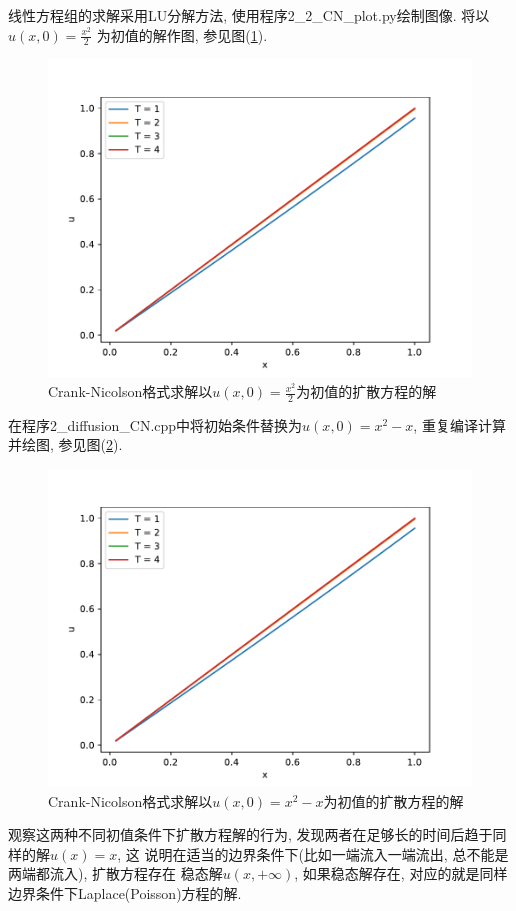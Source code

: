\documentclass[a4paper,zihao=5,UTF8]{ctexart}
\begin{document}
	线性方程组的求解采用LU分解方法, 使用程序2\_2\_CN\_plot.py绘制图像. 将以$u(x, 0) = \frac{x^2}{2}$
	为初值的解作图, 参见图(\ref{2-2-CN-1}). 
	\begin{figure}[htbp]
		\centering 
		\includegraphics[scale=0.7]{2_2_CN_1.pdf}
		\caption{Crank-Nicolson格式求解以$u(x, 0) = \frac{x^2}{2}$为初值的扩散方程的解}
		\label{2-2-CN-1}
	\end{figure} 
	在程序2\_diffusion\_CN.cpp中将初始条件替换为$u(x, 0) = x^2 - x$, 重复编译计算并绘图, 参见图(\ref{2-2-CN-2}). 
	\begin{figure}[htbp]
		\centering 
		\includegraphics[scale=0.7]{2_2_CN_1.pdf}
		\caption{Crank-Nicolson格式求解以$u(x, 0) = x^2 - x$为初值的扩散方程的解}
		\label{2-2-CN-2}
	\end{figure} 
	观察这两种不同初值条件下扩散方程解的行为, 发现两者在足够长的时间后趋于同样的解$u(x) = x$, 这
	说明在适当的边界条件下(比如一端流入一端流出, 总不能是两端都流入), 扩散方程存在
	稳态解$u(x, +\infty)$, 如果稳态解存在, 对应的就是同样边界条件下Laplace(Poisson)方程的解.
\end{document}
